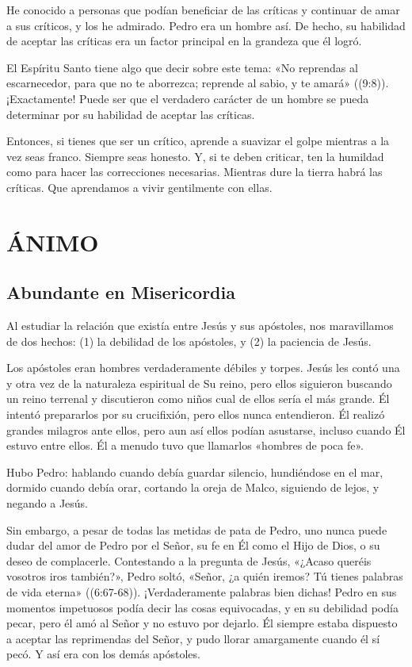 \documentclass[12pt, twoside, openright]{book}
\begin{document}
He conocido a personas que podían beneficiar de las críticas y continuar de amar a sus críticos, y los he admirado. Pedro era un hombre así. De hecho, su habilidad de aceptar las críticas era un factor principal en la grandeza que él logró.

El Espíritu Santo tiene algo que decir sobre este tema: «No reprendas al escarnecedor, para que no te aborrezca; reprende al sabio, y te amará» ((9:8)). ¡Exactamente! Puede ser que el verdadero carácter de un hombre se pueda determinar por su habilidad de aceptar las críticas. 

Entonces, si tienes que ser un crítico, aprende a suavizar el golpe mientras a la vez seas franco. Siempre seas honesto. Y, si te deben criticar, ten la humildad como para hacer las correcciones necesarias. Mientras dure la tierra habrá las críticas. Que aprendamos a vivir gentilmente con ellas.

\chapter{ÁNIMO}

\section{Abundante en Misericordia}
Al estudiar la relación que existía entre Jesús y sus apóstoles, nos maravillamos de dos hechos: (1) la debilidad de los apóstoles, y (2) la paciencia de Jesús.

Los apóstoles eran hombres verdaderamente débiles y torpes. Jesús les contó una y otra vez de la naturaleza espiritual de Su reino, pero ellos siguieron buscando un reino terrenal y discutieron como niños cual de ellos sería el más grande. Él intentó prepararlos por su crucifixión, pero ellos nunca entendieron. Él realizó grandes milagros ante ellos, pero aun así ellos podían asustarse, incluso cuando Él estuvo entre ellos. Él a menudo tuvo que llamarlos «hombres de poca fe».

Hubo Pedro: hablando cuando debía guardar silencio, hundiéndose en el mar, dormido cuando debía orar, cortando la oreja de Malco, siguiendo de lejos, y negando a Jesús. 

Sin embargo, a pesar de todas las metidas de pata de Pedro, uno nunca puede dudar del amor de Pedro por el Señor, su fe en Él como el Hijo de Dios, o su deseo de complacerle. Contestando a la pregunta de Jesús, «¿Acaso queréis vosotros iros también?», Pedro soltó, «Señor, ¿a quién iremos? Tú tienes palabras de vida eterna» ((6:67-68)). ¡Verdaderamente palabras bien dichas! Pedro en sus momentos impetuosos podía decir las cosas equivocadas, y en su debilidad podía pecar, pero él amó al Señor y no estuvo por dejarlo. Él siempre estaba dispuesto a aceptar las reprimendas del Señor, y pudo llorar amargamente cuando él sí pecó. Y así era con los demás apóstoles.
\end{document}
